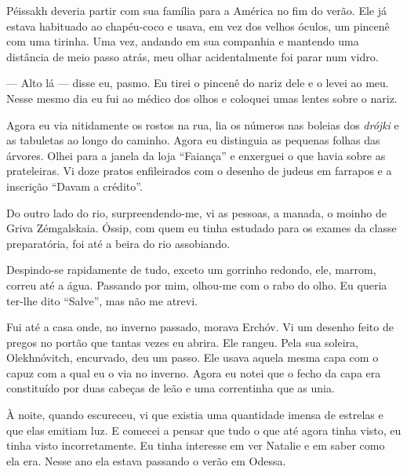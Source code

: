 Péissakh deveria partir com sua família para a América no fim do verão.
Ele já estava habituado ao chapéu-coco e usava, em vez dos velhos
óculos, um pincenê com uma tirinha. Uma vez, andando em sua companhia e
mantendo uma distância de meio passo atrás, meu olhar acidentalmente foi
parar num vidro.

--- Alto lá --- disse eu, pasmo. Eu tirei o pincenê do nariz dele e o
levei ao meu. Nesse mesmo dia eu fui ao médico dos olhos e coloquei umas
lentes sobre o nariz.

Agora eu via nitidamente os rostos na rua, lia os números nas boleias
dos \emph{drójki} e as tabuletas ao longo do caminho. Agora eu
distinguia as pequenas folhas das árvores. Olhei para a janela da loja
``Faiança'' e enxerguei o que havia sobre as prateleiras. Vi doze pratos
enfileirados com o desenho de judeus em farrapos e a inscrição ``Davam a
crédito''.

Do outro lado do rio, surpreendendo-me, vi as pessoas, a manada, o
moinho de Griva Zémgalskaia. Óssip, com quem eu tinha estudado para os
exames da classe preparatória, foi até a beira do rio assobiando.

Despindo-se rapidamente de tudo, exceto um gorrinho redondo, ele,
marrom, correu até a água. Passando por mim, olhou-me com o rabo do
olho. Eu queria ter-lhe dito ``Salve'', mas não me atrevi.

Fui até a casa onde, no inverno passado, morava Erchóv. Vi um desenho
feito de pregos no portão que tantas vezes eu abrira. Ele rangeu. Pela
sua soleira, Olekhnóvitch, encurvado, deu um passo. Ele usava aquela
mesma capa com o capuz com a qual eu o via no inverno. Agora eu notei
que o fecho da capa era constituído por duas cabeças de leão e uma
correntinha que as unia.

À noite, quando escureceu, vi que existia uma quantidade imensa de
estrelas e que elas emitiam luz. E comecei a pensar que tudo o que até
agora tinha visto, eu tinha visto incorretamente. Eu tinha interesse em
ver Natalie e em saber como ela era. Nesse ano ela estava passando o
verão em Odessa.
